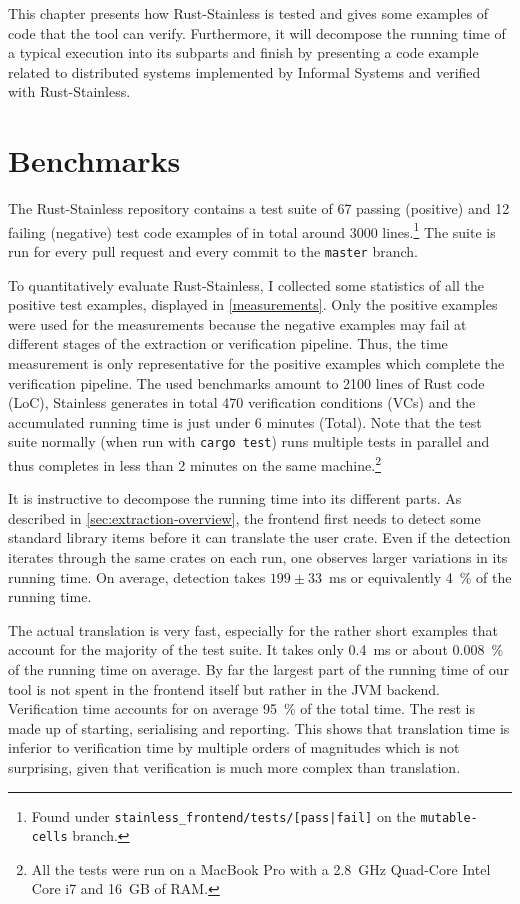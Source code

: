 This chapter presents how Rust-Stainless is tested and gives some examples of
code that the tool can verify. Furthermore, it will decompose the running time
of a typical execution into its subparts and finish by presenting a code example
related to distributed systems implemented by Informal Systems and verified with
Rust-Stainless.

\section{Benchmarks}

The Rust-Stainless repository contains a test suite of 67 passing (positive) and
12 failing (negative) test code examples of in total around 3000
lines.\footnote{Found under \texttt{stainless\_frontend/tests/[pass|fail]} on
the \texttt{mutable-cells} branch.} The suite is run for every pull request and
every commit to the \texttt{master} branch.

To quantitatively evaluate Rust-Stainless, I collected some statistics of all
the positive test examples, displayed in \autoref{measurements}. Only the
positive examples were used for the measurements because the negative examples
may fail at different stages of the extraction or verification pipeline. Thus,
the time measurement is only representative for the positive examples which
complete the verification pipeline. The used benchmarks amount to 2100 lines of
Rust code (LoC), Stainless generates in total 470 verification conditions (VCs)
and the accumulated running time is just under 6 minutes (Total). Note that the
test suite normally (when run with \texttt{cargo test}) runs multiple tests in
parallel and thus completes in less than 2 minutes on the same
machine.\footnote{All the tests were run on a MacBook Pro with a 2.8~GHz
Quad-Core Intel Core i7 and 16~GB of RAM.}

It is instructive to decompose the running time into its different parts. As
described in \autoref{sec:extraction-overview}, the frontend first needs to
detect some standard library items before it can translate the user crate. Even
if the detection iterates through the same crates on each run, one observes
larger variations in its running time. On average, detection takes $199 \pm
33$~ms or equivalently 4~\% of the running time.

The actual translation is very fast, especially for the rather short examples
that account for the majority of the test suite. It takes only 0.4~ms or about
0.008~\% of the running time on average. By far the largest part of the running
time of our tool is not spent in the frontend itself but rather in the JVM
backend. Verification time accounts for on average 95~\% of the total time. The
rest is made up of starting, serialising and reporting. This shows that
translation time is inferior to verification time by multiple orders of
magnitudes which is not surprising, given that verification is much more complex
than translation.

